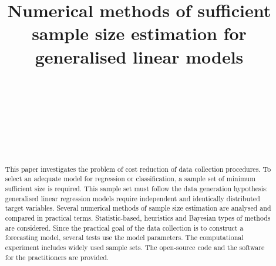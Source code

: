 \documentclass[
11pt,%
tightenlines,%
twoside,%
onecolumn,%
nofloats,%
nobibnotes,%
nofootinbib,%
superscriptaddress,%
noshowpacs,%
centertags]%
{revtex4}
\begin{document}
\title{Numerical methods of sufficient sample size estimation for generalised linear models}
\author{~}

\author{~}

\author{~}

\author{~}


\received{}

\begin{abstract}
This paper investigates the problem of cost reduction of data collection procedures. To select an adequate model for regression or classification, a sample set of minimum sufficient size is required. This sample set must follow the data generation hypothesis: generalised linear regression models require independent and identically distributed target variables.  Several numerical methods of sample size estimation are analysed and compared in practical terms. Statistic-based, heuristics and Bayesian types of methods are considered. Since the practical goal of the data collection is to construct a forecasting model, several tests use the model parameters.  The computational experiment includes widely used sample sets. The open-source code and the software for the practitioners are provided.
\end{abstract}


\maketitle
\end{document}
